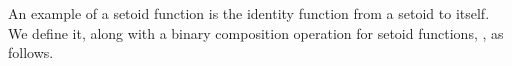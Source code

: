 \ifshort\else
An example of a setoid function is the identity function from a setoid to itself.
We define it, along with a binary composition operation for setoid functions,
, as follows.

\begin{code}%
\>[0]\<%
\\
\>[0]\AgdaSpace{}%
\AgdaSymbol{:}\AgdaSpace{}%
\AgdaSymbol{\{}\AgdaSpace{}%
\AgdaSymbol{:}\AgdaSpace{}%
\AgdaSpace{}%
\AgdaSpace{}%
\AgdaSymbol{\}}\AgdaSpace{}%
\AgdaSpace{}%
\AgdaSpace{}%
\AgdaSpace{}%
\<%
\\
\>[0]\AgdaSpace{}%
\AgdaSymbol{\{}\AgdaSymbol{\}}\AgdaSpace{}%
\AgdaSymbol{=}\AgdaSpace{}%
\AgdaSpace{}%
\AgdaSymbol{\{}\AgdaSpace{}%
\AgdaSpace{}%
\AgdaSymbol{=}\AgdaSpace{}%
\AgdaSpace{}%
\AgdaSymbol{;}\AgdaSpace{}%
\AgdaSpace{}%
\AgdaSymbol{=}\AgdaSpace{}%
\AgdaSpace{}%
\AgdaSymbol{\}}\<%
\\
%
\\[\AgdaEmptyExtraSkip]%
\>[0]\AgdaSpace{}%
\AgdaSymbol{:}%
\>[9]\AgdaSymbol{\{}\AgdaSpace{}%
\AgdaSymbol{:}\AgdaSpace{}%
\AgdaSpace{}%
\AgdaSpace{}%
\AgdaSymbol{\}}\AgdaSpace{}%
\AgdaSymbol{\{}\AgdaSpace{}%
\AgdaSymbol{:}\AgdaSpace{}%
\AgdaSpace{}%
\AgdaSpace{}%
\AgdaSymbol{\}}\AgdaSpace{}%
\AgdaSymbol{\{}\AgdaSpace{}%
\AgdaSymbol{:}\AgdaSpace{}%
\AgdaSpace{}%
\AgdaSpace{}%
\AgdaSymbol{\}}\<%
\\
\>[0][@{}l@{\AgdaIndent{0}}]%
\>[1]%
\>[9]\AgdaSpace{}%
\AgdaSpace{}%
%
\>[16]%
\>[19]\AgdaSpace{}%
\AgdaSpace{}%
%
\>[26]%
\>[29]\AgdaSpace{}%
\AgdaSpace{}%
\<%
\\
%
\\[\AgdaEmptyExtraSkip]%
\>[0]\AgdaSpace{}%
\AgdaSpace{}%
\AgdaSpace{}%
\AgdaSymbol{=}\AgdaSpace{}%

\end{code}
